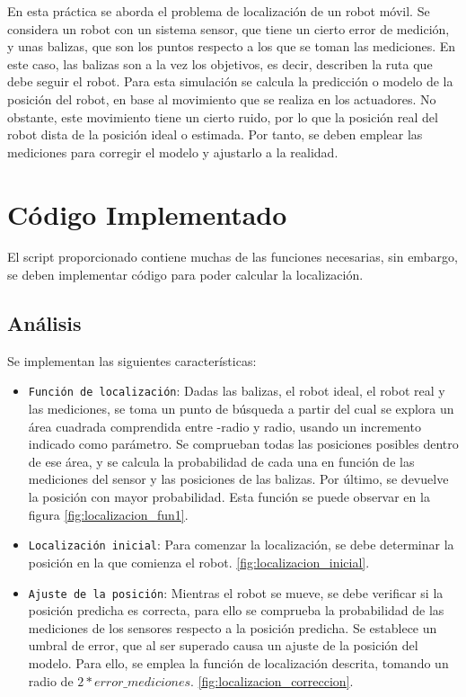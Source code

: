 En esta práctica se aborda el problema de localización de un robot móvil. Se considera un robot con un sistema sensor, que tiene un cierto error de medición, y unas balizas, que son los puntos respecto a los que se toman las mediciones. 
En este caso, las balizas son a la vez los objetivos, es decir, describen la ruta que debe seguir el robot. Para esta simulación se calcula la predicción o modelo de la posición del robot, en base al movimiento que se realiza en los actuadores. 
No obstante, este movimiento tiene un cierto ruido, por lo que la posición real del robot dista de la posición ideal o estimada. Por tanto, se deben emplear las mediciones para corregir el modelo y ajustarlo a la realidad.


\section{Código Implementado}
El script proporcionado contiene muchas de las funciones necesarias, sin embargo, se deben implementar código para poder calcular la localización.

\subsection{Análisis}
Se implementan las siguientes características:
\begin{itemize}
  \item \texttt{Función de localización}: Dadas las balizas, el robot ideal, el robot real y las mediciones, se toma un punto de búsqueda a partir del cual se explora un área cuadrada comprendida entre -radio y radio, 
  usando un incremento indicado como parámetro. Se comprueban todas las posiciones posibles dentro de ese área, y se calcula la probabilidad de cada una en función de las mediciones del sensor y las posiciones de las balizas.
  Por último, se devuelve la posición con mayor probabilidad. Esta función se puede observar en la figura \ref{fig:localizacion_fun1}.
  \item \texttt{Localización inicial}: Para comenzar la localización, se debe determinar la posición en la que comienza el robot. \ref{fig:localizacion_inicial}.
  \item \texttt{Ajuste de la posición}: Mientras el robot se mueve, se debe verificar si la posición predicha es correcta, para ello se comprueba la probabilidad de las mediciones de los sensores respecto a la posición predicha.
  Se establece un umbral de error, que al ser superado causa un ajuste de la posición del modelo. Para ello, se emplea la función de localización descrita, tomando un radio de $2*error\_mediciones$. \ref{fig:localizacion_correccion}.
\end{itemize}


